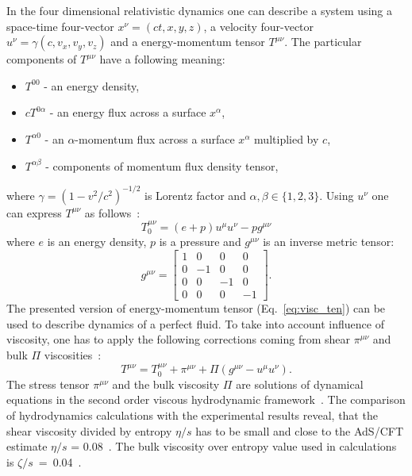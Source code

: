   In the four dimensional relativistic dynamics one can describe a system using a space-time four-vector $x^\nu=(ct,x,y,z)$, a velocity four-vector $u^\nu=\gamma(c,v_x,v_y,v_z)$ and a energy-momentum tensor $T^{\mu\nu}$.
  The particular components of $T^{\mu\nu}$ have a following meaning:
  \begin{itemize}
    \item $T^{00}$ - an energy density,
    \item $c T^{0\alpha}$ - an energy flux across a surface $x^\alpha$,
    \item $T^{\alpha0}$ - an $\alpha$-momentum flux across a surface  $x^\alpha$ multiplied by $c$,
    \item $T^{\alpha\beta}$ - components of momentum flux density tensor,
  \end{itemize}
  where $\gamma = (1-v^2/c^2)^{-1/2}$ is Lorentz factor and $\alpha,\beta \in \{1,2,3\}$.
  Using $u^\nu$ one can express $T^{\mu\nu}$ as follows~\cite{israel}:
  \begin{equation}
    \label{eq:visc_ten}
    T^{\mu\nu}_0 = (e+p)u^\mu u^\nu - pg^{\mu\nu}
  \end{equation}
  where $e$ is an energy density, $p$ is a pressure and $g^{\mu\nu}$ is an inverse metric tensor:
  \begin{equation}
    g^{\mu\nu} = 
    \begin{bmatrix}
      1 & 0 & 0 & 0 \\
      0 & -1 & 0 & 0 \\
      0 & 0 & -1 & 0 \\
      0 & 0 & 0 & -1
    \end{bmatrix} .
  \end{equation}
  The presented version of energy-momentum tensor (Eq.~\ref{eq:visc_ten}) can be used to describe dynamics of a perfect fluid.
  To take into account influence of viscosity, one has to apply the following corrections coming from shear $\pi^{\mu\nu}$ and bulk $\Pi$ viscosities~\cite{visc_hydro}:
  \begin{equation}
    T^{\mu\nu} = T_0^{\mu\nu} + \pi^{\mu\nu} + \Pi(g^{\mu\nu}-u^{\mu}u^{\nu}) .
  \end{equation}
  The stress tensor $\pi^{\mu\nu}$ and the bulk viscosity $\Pi$ are solutions of dynamical equations in the second order viscous hydrodynamic framework~\cite{israel}.
  The comparison of hydrodynamics calculations with the experimental results reveal, that the shear viscosity divided by entropy $\eta / s$ has to be small and close to the AdS/CFT estimate $\eta /s$ = 0.08~\cite{visc_hydro,adscft}.
  The bulk viscosity over entropy value used in calculations is $\zeta /s$~=~0.04~\cite{visc_hydro}.
  
